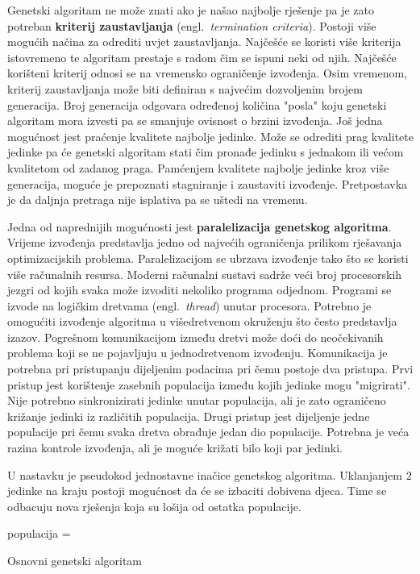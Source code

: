 \documentclass[times, utf8, diplomski]{fer}
\begin{document}
Genetski algoritam ne može znati ako je našao najbolje rješenje pa je zato potreban \textbf{kriterij zaustavljanja} (engl.~\textit{termination criteria}). Postoji više mogućih načina za odrediti uvjet zaustavljanja. Najčešće se koristi više kriterija istovremeno te algoritam prestaje s radom čim se ispuni neki od njih. Najčešće korišteni kriterij odnosi se na vremensko ograničenje izvođenja. Osim vremenom, kriterij zaustavljanja može biti definiran s najvećim dozvoljenim brojem generacija. Broj generacija odgovara određenoj količina "posla" koju genetski algoritam mora izvesti pa se smanjuje ovisnost o brzini izvođenja. Još jedna mogućnost jest praćenje kvalitete najbolje jedinke. Može se odrediti prag kvalitete jedinke pa će genetski algoritam stati čim pronađe jedinku s jednakom ili većom kvalitetom od zadanog praga. Pamćenjem kvalitete najbolje jedinke kroz više generacija, moguće je prepoznati stagniranje i zaustaviti izvođenje. Pretpostavka je da daljnja pretraga nije isplativa pa se uštedi na vremenu.

Jedna od naprednijih mogućnosti jest \textbf{paralelizacija genetskog algoritma}. Vrijeme izvođenja predstavlja jedno od najvećih ograničenja prilikom rješavanja optimizacijskih problema. Paralelizacijom se ubrzava izvođenje tako što se koristi više računalnih resursa. Moderni računalni sustavi sadrže veći broj procesorskih jezgri od kojih svaka može izvoditi nekoliko programa odjednom. Programi se izvode na logičkim dretvama (engl.~\textit{thread}) unutar procesora. Potrebno je omogućiti izvođenje algoritma u višedretvenom okruženju što često predstavlja izazov. Pogrešnom komunikacijom između dretvi može doći do neočekivanih problema koji se ne pojavljuju u jednodretvenom izvođenju. Komunikacija je potrebna pri pristupanju dijeljenim podacima pri čemu postoje dva pristupa. Prvi pristup jest korištenje zasebnih populacija između kojih jedinke mogu "migrirati". Nije potrebno sinkronizirati jedinke unutar populacija, ali je zato ograničeno križanje jedinki iz različitih populacija. Drugi pristup jest dijeljenje jedne populacije pri čemu svaka dretva obrađuje jedan dio populacije. Potrebna je veća razina kontrole izvođenja, ali je moguće križati bilo koji par jedinki.

U nastavku je pseudokod jednostavne inačice genetskog algoritma. Uklanjanjem $2$ jedinke na kraju postoji mogućnost da će se izbaciti dobivena djeca. Time se odbacuju nova rješenja koja su lošija od ostatka populacije.

\begin{algorithm}
	{
		populacija = \init{}\;
		\;
	}
	\caption{Osnovni genetski algoritam}
\end{algorithm}
\end{document}
